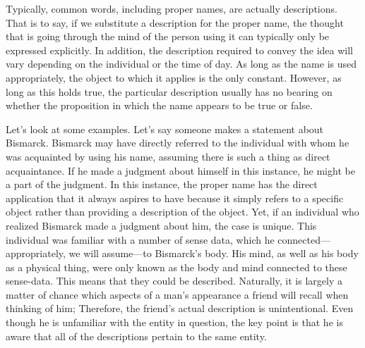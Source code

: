 \documentclass[a4paper,12pt]{book}[2004/02/16]
\theoremstyle{ilemma}
\theoremstyle{itheorem}
\theoremstyle{iother}
\theoremstyle{icorollary}
\theoremstyle{numcorollary}
\theoremstyle{idefinition}
\begin{document}
Typically, common words, including proper names, are actually descriptions. That is to say, if we substitute a description for the proper name, the thought that is going through the mind of the person using it can typically only be expressed explicitly. In addition, the description required to convey the idea will vary depending on the individual or the time of day. As long as the name is used appropriately, the object to which it applies is the only constant. However, as long as this holds true, the particular description usually has no bearing on whether the proposition in which the name appears to be true or false.

Let's look at some examples. Let's say someone makes a statement about Bismarck. Bismarck may have directly referred to the individual with whom he was acquainted by using his name, assuming there is such a thing as direct acquaintance. If he made a judgment about himself in this instance, he might be a part of the judgment. In this instance, the proper name has the direct application that it always aspires to have because it simply refers to a specific object rather than providing a description of the object. Yet, if an individual who
realized Bismarck made a judgment about him, the case is unique. This individual was familiar with a number of sense data, which he connected—appropriately, we will assume—to Bismarck's body. His mind, as well as his body as a physical thing, were only known as the body and mind connected to these sense-data. This means that they could be described. Naturally, it is largely a matter of chance which aspects of a man's appearance a friend will recall when thinking of him; Therefore, the friend's actual description is unintentional. Even though he is unfamiliar with the entity in question, the key point is that he is aware that all of the descriptions pertain to the same entity.
\end{document}

